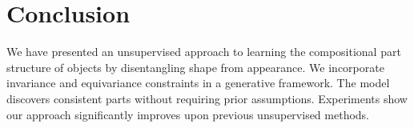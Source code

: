 \section{Conclusion}
We have presented an unsupervised approach to learning the compositional part structure of objects by disentangling shape from appearance. We incorporate invariance and equivariance constraints in a generative framework. The model discovers consistent parts without requiring prior assumptions. Experiments show our approach significantly improves upon previous unsupervised methods.